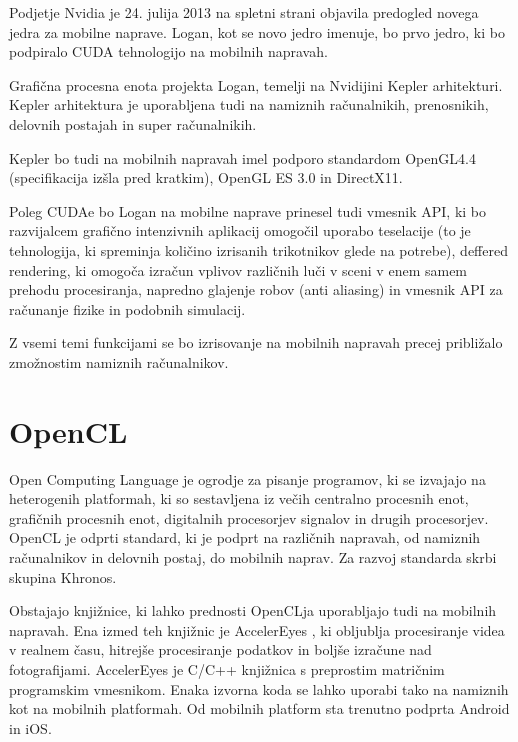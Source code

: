 

Podjetje Nvidia je 24. julija 2013 \cite{cuda-mobile} na spletni strani objavila predogled novega jedra za mobilne naprave. Logan, kot se novo jedro imenuje, bo prvo jedro, ki bo podpiralo CUDA tehnologijo na mobilnih napravah.

Grafična procesna enota projekta Logan, temelji na Nvidijini Kepler arhitekturi. Kepler arhitektura je uporabljena tudi na namiznih računalnikih, prenosnikih, delovnih postajah in super računalnikih.

Kepler bo tudi na mobilnih napravah imel podporo standardom OpenGL4.4 (specifikacija izšla pred kratkim), OpenGL ES 3.0 in DirectX11.

Poleg CUDAe bo Logan na mobilne naprave prinesel tudi vmesnik API, ki bo razvijalcem grafično intenzivnih aplikacij omogočil uporabo teselacije (to je tehnologija, ki spreminja količino izrisanih trikotnikov glede na potrebe), deffered rendering, ki omogoča izračun vplivov različnih luči v sceni v enem samem prehodu procesiranja, napredno glajenje robov (anti aliasing) in vmesnik API za računanje fizike in podobnih simulacij.

Z vsemi temi funkcijami se bo izrisovanje na mobilnih napravah precej približalo zmožnostim namiznih računalnikov. 
 

\section{OpenCL}

Open Computing Language \cite{opencl} je ogrodje za pisanje programov, ki se izvajajo na heterogenih platformah, ki so sestavljena iz večih centralno procesnih enot, grafičnih procesnih enot, digitalnih procesorjev signalov in drugih procesorjev. OpenCL je odprti standard, ki je podprt na različnih napravah, od namiznih računalnikov in delovnih postaj, do mobilnih naprav. Za razvoj standarda skrbi skupina Khronos.

Obstajajo knjižnice, ki lahko prednosti OpenCLja uporabljajo tudi na mobilnih napravah. Ena izmed teh knjižnic je AccelerEyes \cite{accelereyes}, ki obljublja procesiranje videa v realnem času, hitrejše procesiranje podatkov in boljše izračune nad fotografijami. AccelerEyes je C/C++ knjižnica s preprostim matričnim programskim vmesnikom. Enaka izvorna koda se lahko uporabi tako na namiznih kot na mobilnih platformah. Od mobilnih platform sta trenutno podprta Android in iOS.

